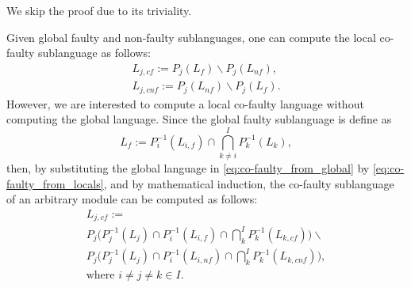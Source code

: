 \documentclass[a4paper, 10pt, conference]{ieeeconf}
\begin{document}

We skip the proof due to its triviality. 

Given global faulty and non-faulty sublanguages, one can compute the local
co-faulty sublanguage as follows:
\begin{equation}
\label{eq:co-faulty_from_global}
	\begin{array}{l}
		L_{j,cf} := P_j(L_f) \backslash P_j(L_{nf}),\\ 
		L_{j,cnf} := P_j(L_{nf}) \backslash P_j(L_{f}).	
	\end{array}
\end{equation}
However, we are interested to compute a local co-faulty
language without computing the global language. Since the global
faulty sublanguage is define as
\begin{equation}
\label{eq:co-faulty_from_locals}
	L_f := P_i^{-1}(L_{i,f}) \cap \bigcap_{k\neq
	i}^I P_k^{-1}(L_k),
\end{equation}
then, by substituting the global language in \ref{eq:co-faulty_from_global} by
\ref{eq:co-faulty_from_locals}, and by mathematical induction, the co-faulty
sublanguage of an arbitrary module can be computed as follows:
\begin{equation}
\label{eq:co-faulty_iterative_w_faulty}
	\begin{array}{l}
		L_{j,cf} := 
		\\
		P_j\Big(P_j^{-1}(L_j) \cap P_i^{-1}(L_{i,f})\cap 
		\bigcap_k^I P_k^{-1}(L_{k,cf})\Big) \backslash 
		\\
		P_j\Big(P_j^{-1}(L_j) \cap P_i^{-1}(L_{i,nf})\cap 
		\bigcap_k^I P_k^{-1}(L_{k,cnf})\Big),
		\\ 
		\textrm{where } i\neq j\neq k \in I.
	\end{array}
\end{equation}
\end{document}
